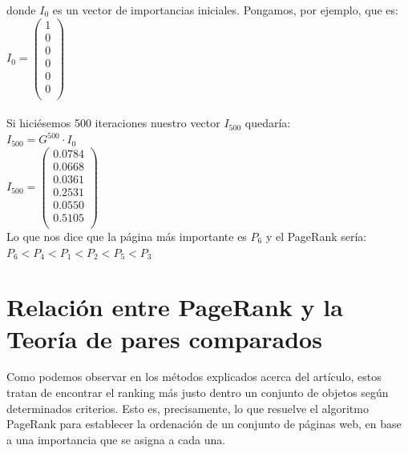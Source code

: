 \documentclass[a4paper]{article}
\begin{document}
donde $I_0$ es un vector de importancias iniciales. Pongamos, por ejemplo, que es:\\

\hspace{5cm}$I_0=\begin{pmatrix}
   1 \\
   0 \\
   0 \\
   0 \\ 
   0 \\
   0 \\
\end{pmatrix}$\\\\

Si hiciésemos 500 iteraciones nuestro vector $I_{500}$ quedaría:\\

\hspace{5cm}$I_{500}= G^{500} \cdot I_0$\\

\hspace{5cm}$I_{500}=\begin{pmatrix}
   0.0784 \\
   0.0668 \\
   0.0361 \\
   0.2531 \\ 
   0.0550 \\
   0.5105 \\
\end{pmatrix}$\\

Lo que nos dice que la página más importante es $P_6$ y el PageRank sería:\\

\hspace{5cm}$P_6 < P_4< P_1 < P_2 < P_5 < P_3$\\


\section{Relación entre PageRank y la Teoría de pares comparados}
Como podemos observar en los métodos explicados acerca del artículo, estos tratan de encontrar el ranking más justo dentro un conjunto de objetos según determinados criterios. Esto es, precisamente, lo que resuelve el algoritmo PageRank para establecer la ordenación de un conjunto de páginas web, en base a una importancia que se asigna a cada una.\\
\end{document}
